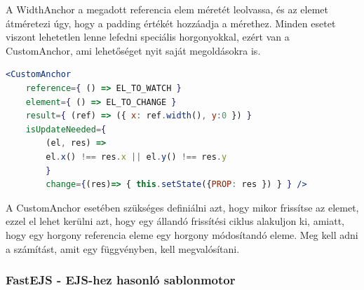 \documentclass[a4paper,12pt,oneside]{report}
\begin{document}
\begin{justify}
	A WidthAnchor a megadott referencia elem méretét leolvassa, és az elemet átméretezi úgy, hogy a padding értékét hozzáadja a mérethez. Minden esetet viszont lehetetlen lenne lefedni speciális horgonyokkal, ezért van a CustomAnchor, ami lehetőséget nyit saját megoldásokra is.

	\begin{lstlisting}[language=jsx]
	<CustomAnchor 
	reference={ () => EL_TO_WATCH }
	element={ () => EL_TO_CHANGE }
	result={ (ref) => ({ x: ref.width(), y:0 }) }
	isUpdateNeeded={
		(el, res) => 
		el.x() !== res.x || el.y() !== res.y 
		}
		change={(res)=> { this.setState({PROP: res }) } } />
	\end{lstlisting}

	A CustomAnchor esetében szükséges definiálni azt, hogy mikor frissítse az elemet, ezzel el lehet kerülni azt, hogy egy állandó frissítési ciklus alakuljon ki, amiatt, hogy egy horgony referencia eleme egy horgony módosítandó eleme. Meg kell adni a számítást, amit egy függvényben, kell megvalósítani.

\end{justify}

\newpage
\subsubsection{FastEJS - EJS-hez hasonló sablonmotor}
\end{document}
